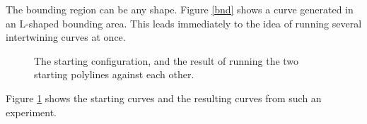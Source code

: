 \documentclass[12pt]{article}
\begin{document}
The bounding region can be any shape.  Figure \ref{bnd} shows a curve
generated in an L-shaped bounding area.  This leads immediately to
the idea of running several intertwining curves at once.
\begin{figure}[h!]
 \begin{center} 
  \parbox{110mm}{\caption{\label{cc} The starting configuration, and
  the result of running the two starting polylines against each
  other.}}
\end{center}
\end{figure}
Figure \ref{cc} shows the
starting curves and the resulting curves from such an experiment.
\end{document}
